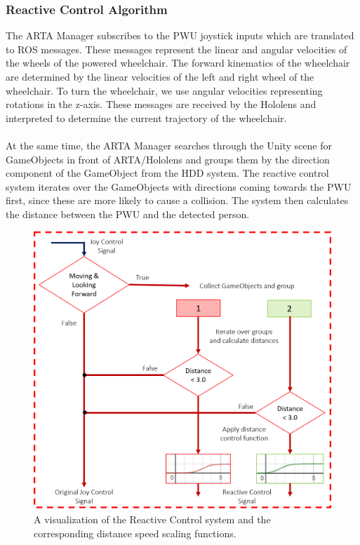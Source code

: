 \subsubsection{Reactive Control Algorithm}
The ARTA Manager subscribes to the PWU joystick inputs which are translated to ROS  messages. These messages represent the linear and angular velocities of the wheels of the powered wheelchair. The forward kinematics of the wheelchair are determined by the linear velocities of the left and right wheel of the wheelchair. To turn the wheelchair, we use angular velocities representing rotations in the z-axis. These messages are received by the Hololens and interpreted to determine the current trajectory of the wheelchair. 

\paragraph{} At the same time, the ARTA Manager searches through the Unity scene for GameObjects in front of ARTA/Hololens and groups them by the direction component of the GameObject from the HDD system. The reactive control system iterates over the GameObjects with directions coming towards the PWU first, since these are more likely to cause a collision. The system then calculates the distance between the PWU and the detected person. 

\begin{figure}[ht]
	\centering
	\includegraphics[width=0.8\linewidth]{img/chapter5_implementation/reactiveControlFlow.png}
	\caption{A visualization of the Reactive Control system and the corresponding distance speed scaling functions.}
	\label{fig:reactiveFlow}
\end{figure}


